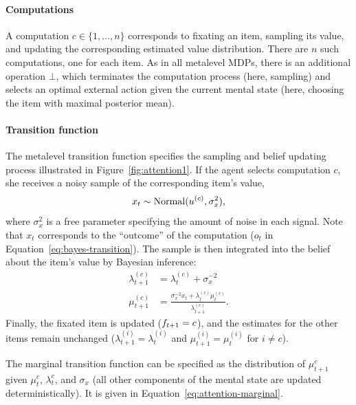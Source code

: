 \paragraph{Computations}
A computation $c \in \{1,\ldots,n\}$ corresponds to fixating an item, sampling its value, and updating the corresponding estimated value distribution. There are $n$ such computations, one for each item. As in all metalevel MDPs, there is an additional operation $\bot$, which terminates the computation process (here, sampling) and selects an optimal external action given the current mental state (here, choosing the item with maximal posterior mean).

\paragraph{Transition function}
The metalevel transition function specifies the sampling and belief updating process illustrated in Figure~\ref{fig:attention1}. If the agent selects computation $c$, she receives a noisy sample of the corresponding item's value,
\begin{equation}\label{eq:signal}
x_{t}\sim \mathrm{Normal}(u^{(c)},\sigma_{x}^{2}),
\end{equation}
where $\sigma_{x}^{2}$ is a free parameter specifying the amount of noise in each signal. Note that $x_t$ corresponds to the ``outcome'' of the computation ($o_t$ in Equation~\ref{eq:bayes-transition}). The sample is then integrated into the belief about the item's value by Bayesian inference:
%
\begin{equation}\label{eq:dynamics}
\begin{aligned}
  \lambda_{t+1}^{(c)} & =\lambda_{t}^{(c)}+\sigma_{x}^{-2}\\
  \mu_{t+1}^{(c)} & =\frac{\sigma_{x}^{-2}x_{t}+\lambda_{t}^{(c)}\mu_{t}^{(c)}}{\lambda_{t+1}^{(c)}}.
\end{aligned}
\end{equation}
Finally, the fixated item is updated ($f_{t+1} = c$), and the estimates for the other items remain unchanged ($\lambda_{t+1}^{(i)} = \lambda_{t}^{(i)}$ and $\mu_{t+1}^{(i)} = \mu_{t}^{(i)}$ for $i\neq c$).

The marginal transition function can be specified as the distribution of $\mu_{t+1}^c$ given $\mu_t^c$, $\lambda_t^c$, and $\sigma_x$ (all other components of the mental state are updated deterministically). It is given in Equation~\ref{eq:attention-marginal}.

